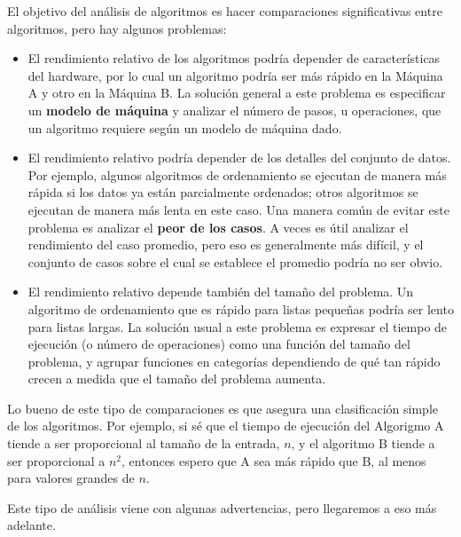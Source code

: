 \documentclass[10pt]{book}
\begin{document}

El objetivo del análisis de algoritmos es hacer comparaciones
significativas entre algoritmos, pero hay algunos problemas:

\begin{itemize}

\item El rendimiento relativo de los algoritmos podría
depender de características del hardware, por lo cual un algoritmo
podría ser más rápido en la Máquina A y otro en la Máquina B.
La solución general a este problema es especificar un
{\bf modelo de máquina} y analizar el número de pasos, u
operaciones, que un algoritmo requiere según un modelo de máquina dado.

\item El rendimiento relativo podría depender de los detalles del
conjunto de datos.  Por ejemplo, algunos algoritmos
de ordenamiento se ejecutan de manera más rápida si los datos ya están parcialmente ordenados;
otros algoritmos se ejecutan de manera más lenta en este caso.
Una manera común de evitar este problema es analizar el
{\bf peor de los casos}.  A veces es útil
analizar el rendimiento del caso promedio, pero eso es generalmente más difícil,
y el conjunto de casos sobre el cual se establece el promedio podría no ser obvio.

\item El rendimiento relativo depende también del tamaño del
problema.  Un algoritmo de ordenamiento que es rápido para listas pequeñas
podría ser lento para listas largas.
La solución usual a este problema es expresar el tiempo de ejecución
(o número de operaciones) como una función del tamaño del problema,
y agrupar funciones en categorías dependiendo de qué tan rápido
crecen a medida que el tamaño del problema aumenta.

\end{itemize}

Lo bueno de este tipo de comparaciones es que asegura
una clasificación simple de los algoritmos.  Por ejemplo,
si sé que el tiempo de ejecución del Algorigmo A tiende a ser
proporcional al tamaño de la entrada, $n$, y el algoritmo B
tiende a ser proporcional a $n^2$, entonces
espero que A sea más rápido que B, al menos para valores grandes de $n$.

Este tipo de análisis viene con algunas advertencias, pero llegaremos
a eso más adelante.
\end{document}
